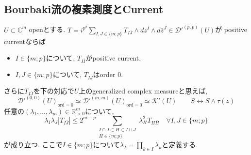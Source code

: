 \subsection{Bourbaki流の複素測度とCurrent}

\begin{tcolorbox}[mybox]
\begin{prop}
\label{prop-M-8.4.9}
 $U\subset \mathbb{C}^m$ openとする. 
$T=i^{p^2}\sum_{I,J\in \{ m; p\}} T_{I\bar J}\wedge dz^I\wedge d\bar z^J \in \mathcal{D}'^{(p,p)}(U)
$が
positive currentならば
\begin{itemize}
\item $I\in \{ m; p\}$について, $ T_{I\bar I}$がpositive current.
\item $I,J\in \{ m; p\}$について, $T_{I\bar J}$はorder 0.
\end{itemize}

さらに$T_{I\bar J}$を下の対応で$U$上のgeneralized  complex measureと思えば, 
$$
\mathcal{D}'^{(0,0)}(U)_{\mathrm{ord}=0}\underset{}{\simeq}\mathcal{D}'^{(m,m)}(U)_{\mathrm{ord}=0}
\underset{}{\simeq}\mathcal{K}'(U)
\qquad
S \longleftrightarrow S\wedge \tau(z)
$$ 
任意の$(\lambda_1,\ldots,\lambda_m)\in \mathbb{R}_{>0}^m$について, 
\begin{equation*}
\lambda_I\lambda_J |T_{I\bar J}|
\leq
2^{m-p}\sum_{\substack{I\cap J\subset H\subset I\cup J\\ H\in \{ m; p\}}}
\lambda_H^2 T_{H\bar H}
\quad
\forall
I,J\in  \{ m; p\}
\end{equation*}
が成り立つ. ここで$I\in \{ m; p\}$について$\lambda_I=\prod_{k\in I}\lambda_k$と定義する. 
\end{prop}
\end{tcolorbox}

